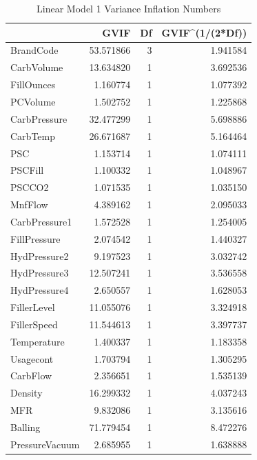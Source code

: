 \documentclass[]{report}
\begin{document}
\begin{table}[H]

\caption{\label{tab:project2a7}Linear Model 1 Variance Inflation Numbers}
\centering
\begin{tabular}[t]{l|r|r|r}
\hline
\textbf{ } & \textbf{GVIF} & \textbf{Df} & \textbf{GVIF\textasciicircum{}(1/(2*Df))}\\
\hline
\rowcolor{gray!6}  BrandCode & 53.571866 & 3 & 1.941584\\
\hline
CarbVolume & 13.634820 & 1 & 3.692536\\
\hline
\rowcolor{gray!6}  FillOunces & 1.160774 & 1 & 1.077392\\
\hline
PCVolume & 1.502752 & 1 & 1.225868\\
\hline
\rowcolor{gray!6}  CarbPressure & 32.477299 & 1 & 5.698886\\
\hline
CarbTemp & 26.671687 & 1 & 5.164464\\
\hline
\rowcolor{gray!6}  PSC & 1.153714 & 1 & 1.074111\\
\hline
PSCFill & 1.100332 & 1 & 1.048967\\
\hline
\rowcolor{gray!6}  PSCCO2 & 1.071535 & 1 & 1.035150\\
\hline
MnfFlow & 4.389162 & 1 & 2.095033\\
\hline
\rowcolor{gray!6}  CarbPressure1 & 1.572528 & 1 & 1.254005\\
\hline
FillPressure & 2.074542 & 1 & 1.440327\\
\hline
\rowcolor{gray!6}  HydPressure2 & 9.197523 & 1 & 3.032742\\
\hline
HydPressure3 & 12.507241 & 1 & 3.536558\\
\hline
\rowcolor{gray!6}  HydPressure4 & 2.650557 & 1 & 1.628053\\
\hline
FillerLevel & 11.055076 & 1 & 3.324918\\
\hline
\rowcolor{gray!6}  FillerSpeed & 11.544613 & 1 & 3.397737\\
\hline
Temperature & 1.400337 & 1 & 1.183358\\
\hline
\rowcolor{gray!6}  Usagecont & 1.703794 & 1 & 1.305295\\
\hline
CarbFlow & 2.356651 & 1 & 1.535139\\
\hline
\rowcolor{gray!6}  Density & 16.299332 & 1 & 4.037243\\
\hline
MFR & 9.832086 & 1 & 3.135616\\
\hline
\rowcolor{gray!6}  Balling & 71.779454 & 1 & 8.472276\\
\hline
PressureVacuum & 2.685955 & 1 & 1.638888\\

\end{tabular}
\end{table}
\end{document}
